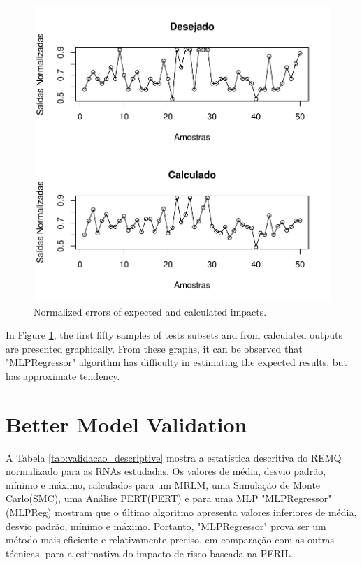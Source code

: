 \begin{figure}[!h]
  \vspace{-0.2cm}
  \centering
  \includegraphics[width=0.7\columnwidth]{image/mlpreg_ex4_2.pdf}
  \caption{Normalized errors of expected and calculated impacts.}
  \label{fig:anns_result_8}
\end{figure}

In Figure \ref{fig:anns_result_8}, the first fifty samples of tests subsets and from calculated outputs are presented graphically. From these graphs, it can be observed that "MLPRegressor" algorithm has difficulty in estimating the expected results, but has approximate tendency.

\section{Better Model Validation}

A Tabela \ref{tab:validacao_descriptive} mostra a estatística descritiva do REMQ normalizado para as RNAs estudadas. Os valores de média, desvio padrão, mínimo e máximo, calculados para um MRLM, uma Simulação de Monte Carlo(SMC), uma Análise PERT(PERT) e para uma MLP "MLPRegressor"(MLPReg) mostram que o último algoritmo apresenta valores inferiores de média, desvio padrão, mínimo e máximo. Portanto, "MLPRegressor" prova ser um método mais eficiente e relativamente preciso, em comparação com as outras técnicas, para a estimativa do impacto de risco baseada na PERIL.

